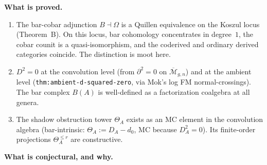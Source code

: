 \documentclass[11pt]{article}
\newcommand{\cM}{\mathcal{M}}
\begin{document}
\medskip
\noindent\textbf{What is proved.}
\begin{enumerate}[label=(\alph*)]
\item The bar-cobar adjunction $B \dashv \Omega$ is a Quillen equivalence on
 the Koszul locus (Theorem~B). On this locus, bar cohomology concentrates
 in degree~$1$, the cobar counit is a quasi-isomorphism, and the coderived
 and ordinary derived categories coincide. The distinction is moot here.

\item $D^2 = 0$ at the convolution level (from $\partial^2 = 0$ on $\overline{\cM}_{g,n}$)
 and at the ambient level (\texttt{thm:ambient-d-squared-zero}, via Mok's log FM
 normal-crossings). The bar complex $B(A)$ is well-defined as a factorization
 coalgebra at all genera.

\item The shadow obstruction tower $\Theta_A$ exists as an MC element in the
 convolution algebra (bar-intrinsic: $\Theta_A := D_A - d_0$, MC because $D_A^2 = 0$).
 Its finite-order projections $\Theta_A^{\leq r}$ are constructive.
\end{enumerate}

\medskip
\noindent\textbf{What is conjectural, and why.}
\end{document}
